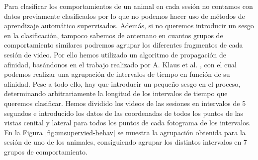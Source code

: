 Para clasificar los comportamientos de un animal en cada sesión no contamos con datos previamente clasificados por lo que no podemos hacer uso de métodos de aprendizaje automático supervisados. Además, si no queremos introducir un sesgo en la clasificación, tampoco sabemos de antemano en cuantos grupos de comportamiento similares podremos agrupar los diferentes fragmentos de cada sesión de video. Por ello hemos utilizado un algoritmo de propagación de afinidad, basándonos en el trabajo realizado por A. Klaus et al. \cite{neuron}, con el cual podemos realizar una agrupación de intervalos de tiempo en función de su afinidad. Pese a todo ello, hay que introducir un pequeño sesgo en el proceso, determinando arbitrariamente la longitud de los intervalos de tiempo que queremos clasificar. Hemos dividido los videos de las sesiones en intervalos de 5 segundos e introducido los datos de las coordenadas de todos los puntos de las vistas cenital y lateral para todos los puntos de cada fotograma de los intervalos. En la Figura \ref{fig:unsupervied-behav} se muestra la agrupación obtenida para la sesión de uno de los animales, consiguiendo agrupar los distintos intervalos en 7 grupos de comportamiento.

